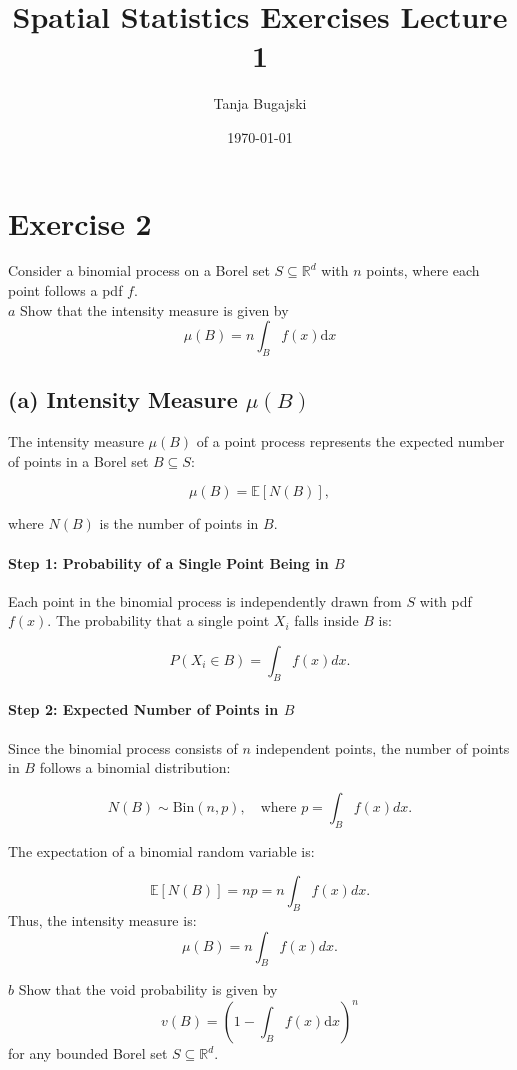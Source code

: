 \documentclass{article}
\title{Spatial Statistics Exercises Lecture 1}
\author{Tanja Bugajski}
\date{\today}
\begin{document}
\maketitle

\section*{Exercise 2}
Consider a binomial process on a Borel set $S\subseteq \mathbb{R}^d$ with $n$ points, where
each point follows a pdf $f$. \\
\(a\) Show that the intensity measure is given by
\[
\mu(B)=n\int_B f(x) \text{d}x
\]
\subsection*{(a) Intensity Measure $\mu(B)$}

The intensity measure $\mu(B)$ of a point process represents the expected number of points in a Borel set $B \subseteq S$:

\[
    \mu(B) = \mathbb{E}[N(B)],
\]

where $N(B)$ is the number of points in $B$.

\paragraph{Step 1: Probability of a Single Point Being in $B$}
Each point in the binomial process is independently drawn from $S$ with pdf $f(x)$. The probability that a single point $X_i$ falls inside $B$ is:

\[
    P(X_i \in B) = \int_B f(x) dx.
\]

\paragraph{Step 2: Expected Number of Points in $B$}
Since the binomial process consists of $n$ independent points, the number of points in $B$ follows a binomial distribution:

\[
    N(B) \sim \text{Bin}(n, p), \quad \text{where } p = \int_B f(x) dx.
\]

The expectation of a binomial random variable is:

\[
    \mathbb{E}[N(B)] = n p = n \int_B f(x) dx.
\]
Thus, the intensity measure is:
\[
    \mu(B) = n \int_B f(x) dx.
\]

\(b\)  Show that the void probability is given by
\[
v(B)=\left( 1-\int_B f(x) \text{d}x \right)^n
\]
for any bounded Borel set $S\subseteq \mathbb{R}^d$.
\end{document}
